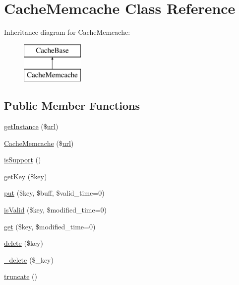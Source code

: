 \hypertarget{classCacheMemcache}{}\section{Cache\+Memcache Class Reference}
\label{classCacheMemcache}
Inheritance diagram for Cache\+Memcache\+:\begin{figure}[H]
\begin{center}
\leavevmode
\includegraphics[height=2.000000cm]{classCacheMemcache}
\end{center}
\end{figure}
\subsection*{Public Member Functions}
\begin{DoxyCompactItemize}
\item 
\hyperlink{classCacheMemcache_a951aa78ba49fdb971def3e2bb8b7db2e}{get\+Instance} (\$\hyperlink{swfupload_8js_a440a52a9004fdab0700100a6ddb49f67}{url})
\item 
\hyperlink{classCacheMemcache_ac4810e2e11716523e49df5a14b2fc215}{Cache\+Memcache} (\$\hyperlink{swfupload_8js_a440a52a9004fdab0700100a6ddb49f67}{url})
\item 
\hyperlink{classCacheMemcache_a4ea35bdd7cc26faa01996dbbc162720f}{is\+Support} ()
\item 
\hyperlink{classCacheMemcache_a27f400a936cc3efb152acc12edb379e1}{get\+Key} (\$key)
\item 
\hyperlink{classCacheMemcache_aaf8fbd3ad05138296cb522fe8c133017}{put} (\$key, \$buff, \$valid\+\_\+time=0)
\item 
\hyperlink{classCacheMemcache_af0882957fc5b20e7fb70aeae652920e8}{is\+Valid} (\$key, \$modified\+\_\+time=0)
\item 
\hyperlink{classCacheMemcache_a9a3db7b30c229677ce7c331aa41f9e9a}{get} (\$key, \$modified\+\_\+time=0)
\item 
\hyperlink{classCacheMemcache_aca057fd092e1a938410a20e16d2d2d7f}{delete} (\$key)
\item 
\hyperlink{classCacheMemcache_a8ac0c5d0703aaeaabec2c478984d43fa}{\+\_\+delete} (\$\+\_\+key)
\item 
\hyperlink{classCacheMemcache_a064b47c5872cde9ff686b148bf005849}{truncate} ()
\end{DoxyCompactItemize}
